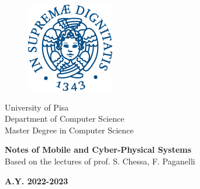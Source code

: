 \begin{titlepage}
	\begin{figure}[!htb]
		\centering
		\includegraphics[keepaspectratio=true,scale=0.5]{images/cherubino_pant541_144}
	\end{figure}
	
	\begin{center}
		\LARGE{University of Pisa}
		\vspace{5mm}
		\\ \large{Department of Computer Science }
		\vspace{5mm}
		\\ \LARGE{Master Degree in Computer Science}
	\end{center}
	
	\vspace{15mm}
	\begin{center}
		{\LARGE{\bf Notes of Mobile and Cyber-Physical Systems
			}{\\\vspace{15mm}\small Based on the lectures of prof. S. Chessa, F. Paganelli}}
	\end{center}
	\vspace{30mm}
	
	\begin{center}
		{\normalsize\vspace{3mm}
			\bf \large{A.Y. 2022-2023}}
	\end{center}
	
	
\end{titlepage}